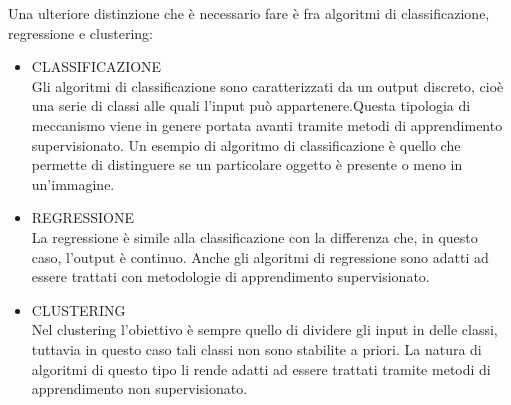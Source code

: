 	Una ulteriore distinzione che è necessario fare è fra algoritmi di classificazione, regressione e clustering:
	\begin{itemize}
		\item CLASSIFICAZIONE \\
			Gli algoritmi di classificazione sono caratterizzati da un output discreto, cioè una serie di classi alle quali l'input può appartenere.Questa tipologia di meccanismo viene in genere portata avanti tramite metodi di apprendimento supervisionato. Un esempio di algoritmo di classificazione è quello che permette di distinguere se un particolare oggetto è presente o meno in un'immagine.
		\item REGRESSIONE \\
			La regressione è simile alla classificazione con la differenza che, in questo caso, l'output è continuo. Anche gli algoritmi di regressione sono adatti ad essere trattati con metodologie di apprendimento supervisionato.
		\item CLUSTERING \\
			Nel clustering l'obiettivo è sempre quello di dividere gli input in delle classi, tuttavia in questo caso tali classi non sono stabilite a priori. La natura di algoritmi di questo tipo li rende adatti ad essere trattati tramite metodi di apprendimento non supervisionato.
	\end{itemize}
	
	


